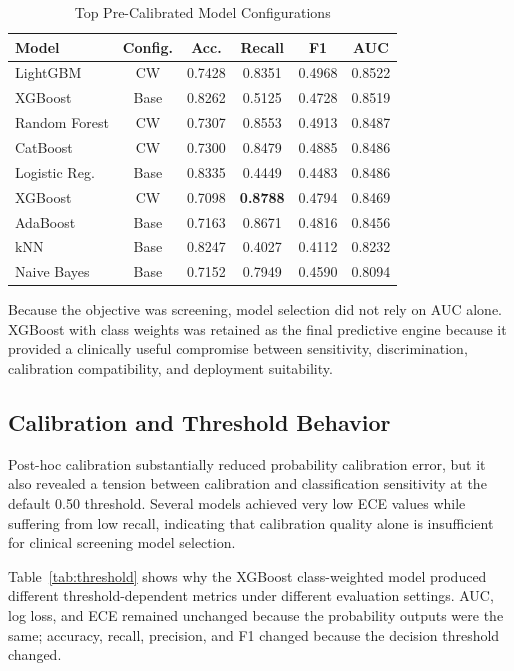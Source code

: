 \documentclass[journal]{IEEEtran}
\begin{document}
\begin{table}[!t]
\caption{Top Pre-Calibrated Model Configurations}
\label{tab:precal}
\centering
\footnotesize
\begin{tabular}{lccccc}
\toprule
Model & Config. & Acc. & Recall & F1 & AUC\\
\midrule
LightGBM & CW & 0.7428 & 0.8351 & 0.4968 & 0.8522\\
XGBoost & Base & 0.8262 & 0.5125 & 0.4728 & 0.8519\\
Random Forest & CW & 0.7307 & 0.8553 & 0.4913 & 0.8487\\
CatBoost & CW & 0.7300 & 0.8479 & 0.4885 & 0.8486\\
Logistic Reg. & Base & 0.8335 & 0.4449 & 0.4483 & 0.8486\\
XGBoost & CW & 0.7098 & \textbf{0.8788} & 0.4794 & 0.8469\\
AdaBoost & Base & 0.7163 & 0.8671 & 0.4816 & 0.8456\\
kNN & Base & 0.8247 & 0.4027 & 0.4112 & 0.8232\\
Naive Bayes & Base & 0.7152 & 0.7949 & 0.4590 & 0.8094\\
\bottomrule
\end{tabular}
\end{table}

Because the objective was screening, model selection did not rely on AUC alone. XGBoost with class weights was retained as the final predictive engine because it provided a clinically useful compromise between sensitivity, discrimination, calibration compatibility, and deployment suitability.

\subsection{Calibration and Threshold Behavior}
Post-hoc calibration substantially reduced probability calibration error, but it also revealed a tension between calibration and classification sensitivity at the default 0.50 threshold. Several models achieved very low ECE values while suffering from low recall, indicating that calibration quality alone is insufficient for clinical screening model selection.

Table~\ref{tab:threshold} shows why the XGBoost class-weighted model produced different threshold-dependent metrics under different evaluation settings. AUC, log loss, and ECE remained unchanged because the probability outputs were the same; accuracy, recall, precision, and F1 changed because the decision threshold changed.
\end{document}
